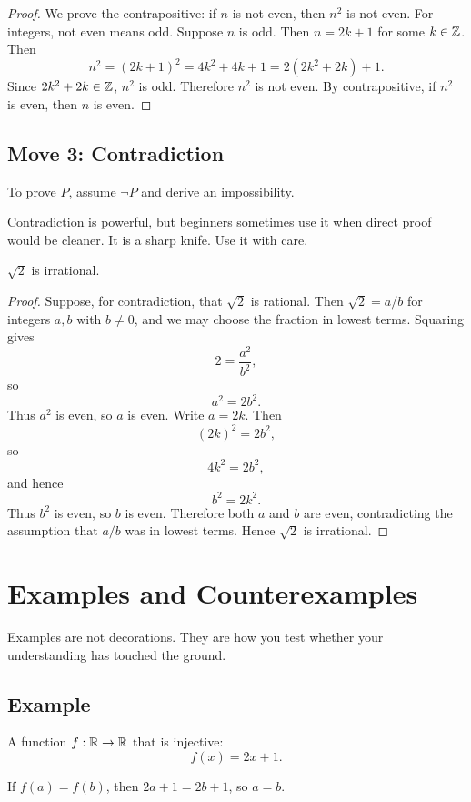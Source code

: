 \documentclass[11pt]{article}
\begin{document}
\begin{proof}
We prove the contrapositive: if $n$ is not even, then $n^2$ is not even. For integers, not even means odd. Suppose $n$ is odd. Then $n=2k+1$ for some $k\in\mathbb{Z}$. Then
\[
n^2=(2k+1)^2=4k^2+4k+1=2(2k^2+2k)+1.
\]
Since $2k^2+2k\in\mathbb{Z}$, $n^2$ is odd. Therefore $n^2$ is not even. By contrapositive, if $n^2$ is even, then $n$ is even.
\end{proof}

\subsection{Move 3: Contradiction}

To prove $P$, assume $\neg P$ and derive an impossibility.

Contradiction is powerful, but beginners sometimes use it when direct proof would be cleaner. It is a sharp knife. Use it with care.

\begin{theorem}
$\sqrt2$ is irrational.
\end{theorem}

\begin{proof}
Suppose, for contradiction, that $\sqrt2$ is rational. Then $\sqrt2=a/b$ for integers $a,b$ with $b\neq0$, and we may choose the fraction in lowest terms. Squaring gives
\[
2=\frac{a^2}{b^2},
\]
so
\[
a^2=2b^2.
\]
Thus $a^2$ is even, so $a$ is even. Write $a=2k$. Then
\[
(2k)^2=2b^2,
\]
so
\[
4k^2=2b^2,
\]
and hence
\[
b^2=2k^2.
\]
Thus $b^2$ is even, so $b$ is even. Therefore both $a$ and $b$ are even, contradicting the assumption that $a/b$ was in lowest terms. Hence $\sqrt2$ is irrational.
\end{proof}

\newpage
\section{Examples and Counterexamples}

Examples are not decorations. They are how you test whether your understanding has touched the ground.

\subsection{Example}

A function $f:\mathbb{R}\to\mathbb{R}$ that is injective:
\[
f(x)=2x+1.
\]

If $f(a)=f(b)$, then $2a+1=2b+1$, so $a=b$.
\end{document}
